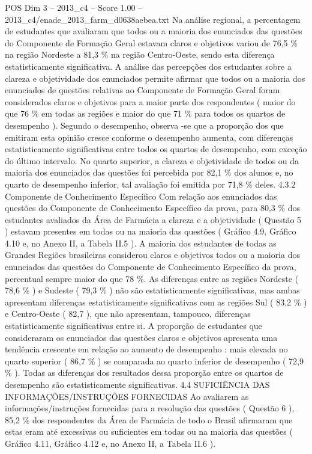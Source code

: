 \begin{textsample}{POS Dim 3 – 2013\_c4 – Score 1.00 – 2013\_c4/enade\_2013\_farm\_d0638aebea.txt}
Na análise regional, a percentagem de estudantes que avaliaram que todos ou a maioria dos enunciados das questões do Componente de Formação Geral estavam claros e objetivos variou de 76,5 \% na região Nordeste a 81,3 \% na região Centro-Oeste, sendo esta diferença estatisticamente significativa.
A análise das percepções dos estudantes sobre a clareza e objetividade dos enunciados permite afirmar que todos ou a maioria dos enunciados de questões relativas ao Componente de Formação Geral foram considerados claros e objetivos para a maior parte dos respondentes ( maior do que 76 \% em todas as regiões e maior do que 71 \% para todos os quartos de desempenho ).
Segundo o desempenho, observa -se que a proporção dos que emitiram esta opinião cresce conforme o desempenho aumenta, com diferenças estatisticamente significativas entre todos os quartos de desempenho, com exceção do último intervalo.
No quarto superior, a clareza e objetividade de todos ou da maioria dos enunciados das questões foi percebida por 82,1 \% dos alunos e, no quarto de desempenho inferior, tal avaliação foi emitida por 71,8 \% deles. 4.3.2 Componente de Conhecimento Específico Com relação aos enunciados das questões do Componente de Conhecimento Específico da prova, para 80,3 \% dos estudantes avaliados da Área de Farmácia a clareza e a objetividade ( Questão 5 ) estavam presentes em todas ou na maioria das questões ( Gráfico 4.9, Gráfico 4.10 e, no Anexo II, a Tabela II.5 ).
A maioria dos estudantes de todas as Grandes Regiões brasileiras considerou claros e objetivos todos ou a maioria dos enunciados das questões do Componente de Conhecimento Específico da prova, percentual sempre maior do que 78 \%.
As diferenças entre as regiões Nordeste ( 78,6 \% ) e Sudeste ( 79,3 \% ) não são estatisticamente significativas, mas ambas apresentam diferenças estatisticamente significativas com as regiões Sul ( 83,2 \% ) e Centro-Oeste ( 82,7 ), que não apresentam, tampouco, diferenças estatisticamente significativas entre si.
A proporção de estudantes que consideraram os enunciados das questões claros e objetivos apresenta uma tendência crescente em relação ao aumento de desempenho : mais elevada no quarto superior ( 86,7 \% ) se comparada ao quarto inferior de desempenho ( 72,9 \% ).
Todas as diferenças dos resultados dessa proporção entre os quartos de desempenho são estatisticamente significativas. 4.4 SUFICIÊNCIA DAS INFORMAÇÕES/INSTRUÇÕES FORNECIDAS Ao avaliarem as informações/instruções fornecidas para a resolução das questões ( Questão 6 ), 85,2 \% dos respondentes da Área de Farmácia de todo o Brasil afirmaram que estas eram até excessivas ou suficientes em todas ou na maioria das questões ( Gráfico 4.11, Gráfico 4.12 e, no Anexo II, a Tabela II.6 ).

\end{textsample}
